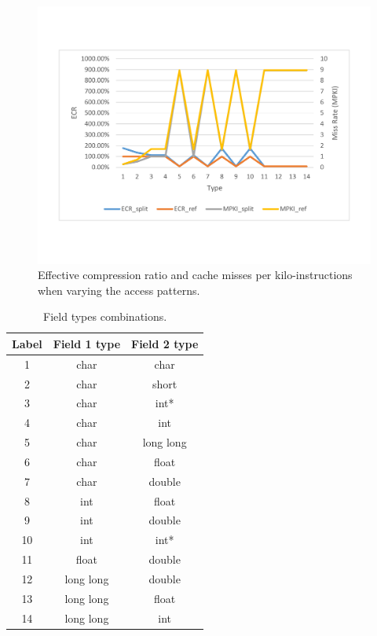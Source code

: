 \begin{figure}[htb]
\centering
\includegraphics[trim=0mm 0mm 0mm 0mm,clip,width=1\linewidth]{figs/figure4.pdf}
\caption{Effective compression ratio and cache misses per kilo-instructions when
varying the access patterns.}
\label{fig:access-pattern}
\end{figure}

\begin{table}[htb]
\centering
\begin{tabular}{ccc}
\toprule
Label & Field 1 type & Field 2 type \\
\midrule
1 & char & char \\
2 & char & short \\
3 & char & int* \\
4 & char & int \\
5 & char & long long \\
6 & char & float \\
7 & char & double \\
8 & int & float \\
9 & int & double \\
10 & int & int* \\
11 & float & double \\
12 & long long & double \\
13 & long long & float \\
14 & long long & int \\
\bottomrule
\end{tabular}
\caption{Field types combinations.}
\label{tbl:field-combinations}
\end{table}

